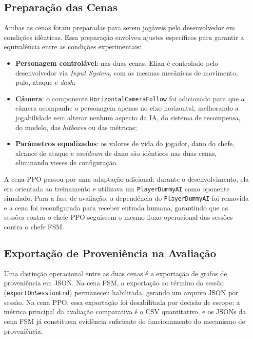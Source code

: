 \subsection{Preparação das Cenas}
\label{subsec:preparacao-cenas}

Ambas as cenas foram preparadas para serem jogáveis pelo desenvolvedor em
condições idênticas. Essa preparação envolveu ajustes específicos para
garantir a equivalência entre as condições experimentais:

\begin{itemize}
    \item \textbf{Personagem controlável}: nas duas cenas, Elian é controlado
          pelo desenvolvedor via \textit{Input System}, com as mesmas
          mecânicas de movimento, pulo, ataque e \textit{dash};
    \item \textbf{Câmera}: o componente \texttt{HorizontalCameraFollow} foi
          adicionado para que a câmera acompanhe o personagem apenas no eixo
          horizontal, melhorando a jogabilidade sem alterar nenhum aspecto da
          IA, do sistema de recompensa, do modelo, das \textit{hitboxes} ou
          das métricas;
    \item \textbf{Parâmetros equalizados}: os valores de vida do jogador, dano
          do chefe, alcance de ataque e \textit{cooldown} de dano são
          idênticos nas duas cenas, eliminando vieses de configuração.
\end{itemize}

A cena PPO passou por uma adaptação adicional: durante o desenvolvimento, ela
era orientada ao treinamento e utilizava um \texttt{PlayerDummyAI} como
oponente simulado. Para a fase de avaliação, a dependência do
\texttt{PlayerDummyAI} foi removida e a cena foi reconfigurada para receber
entrada humana, garantindo que as sessões contra o chefe PPO seguissem o mesmo
fluxo operacional das sessões contra o chefe FSM.

\subsection{Exportação de Proveniência na Avaliação}
\label{subsec:proveniencia-avaliacao}

Uma distinção operacional entre as duas cenas é a exportação de grafos de
proveniência em JSON. Na cena FSM, a exportação ao término da sessão
(\texttt{exportOnSessionEnd}) permaneceu habilitada, gerando um arquivo JSON
por sessão. Na cena PPO, essa exportação foi desabilitada por decisão de
escopo: a métrica principal da avaliação comparativa é o CSV quantitativo, e
os JSONs da cena FSM já constituem evidência suficiente do funcionamento do
mecanismo de proveniência.

